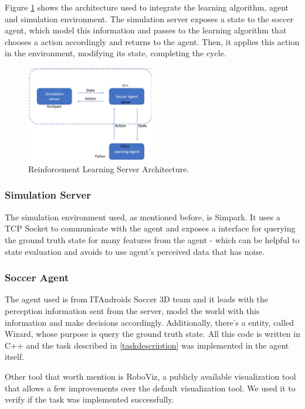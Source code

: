 Figure \ref{rlserver} shows the architecture used to integrate the learning algorithm, agent and simulation environment. The simulation server exposes a state to the soccer agent, which model this information and passes to the learning algorithm that chooses a action accordingly and returns to the agent. Then, it applies this action in the environment, modifying its state, completing the cycle.

\begin{figure}[!htbp]
	\centering
	\includegraphics[width=0.5\textwidth]{Cap5/rlserver.eps}
	\caption{Reinforcement Learning Server Architecture.
		\cite{tgmuzio}
	}
	\label{rlserver}
\end{figure}

\subsubsection{Simulation Server}

The simulation environment used, as mentioned before, is Simpark. It uses a TCP Socket to communicate with the agent and exposes a interface for querying the ground truth state for many features from the agent - which can be helpful to state evaluation and avoids to use agent's perceived data that has noise. 

\subsubsection{Soccer Agent}
The agent used is from ITAndroids Soccer 3D team and it leads with the perception information sent from the server, model the world with this information and make decisions accordingly. Additionally, there's a entity, called Wizard, whose purpose is query the ground truth state. All this code is written in C++ and the task described in \ref{taskdescription} was implemented in the agent itself.

Other tool that worth mention is RoboViz, a publicly available visualization tool that allows a few improvements over the default visualization tool. We used it to verify if the task was implemented successfully.

